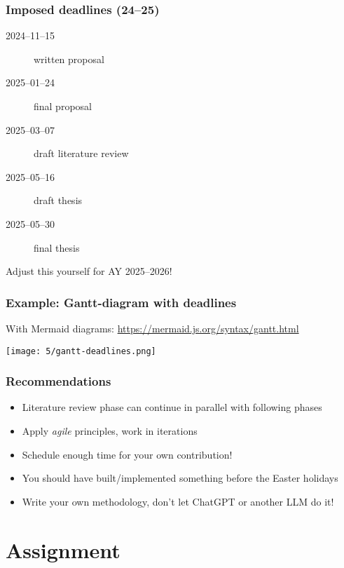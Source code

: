 \documentclass[aspectratio=169]{beamer}
\begin{document}
\begin{frame}
  \frametitle{Imposed deadlines (24--25)}

  \begin{description}
    \item[2024--11--15] written proposal
    \item[2025--01--24] final proposal
    \item[2025--03--07] draft literature review
    \item[2025--05--16] draft thesis
    \item[2025--05--30] final thesis
  \end{description}

  \medskip

  Adjust this yourself for AY 2025--2026!
\end{frame}

\begin{frame}[plain]
  \frametitle{Example: Gantt-diagram with deadlines}

  With Mermaid diagrams: \url{https://mermaid.js.org/syntax/gantt.html}

  \centering
  \texttt{[image: 5/gantt-deadlines.png]}
\end{frame}

\begin{frame}
  \frametitle{Recommendations}

  \begin{itemize}
    \item Literature review phase can continue in parallel with following phases
    \item Apply \textit{agile} principles, work in iterations
    \item Schedule enough time for your own contribution!
    \item You should have built/implemented something before the Easter holidays
    \item Write your own methodology, don't let ChatGPT or another LLM do it!
  \end{itemize}
\end{frame}
\section{Assignment}
\end{document}

